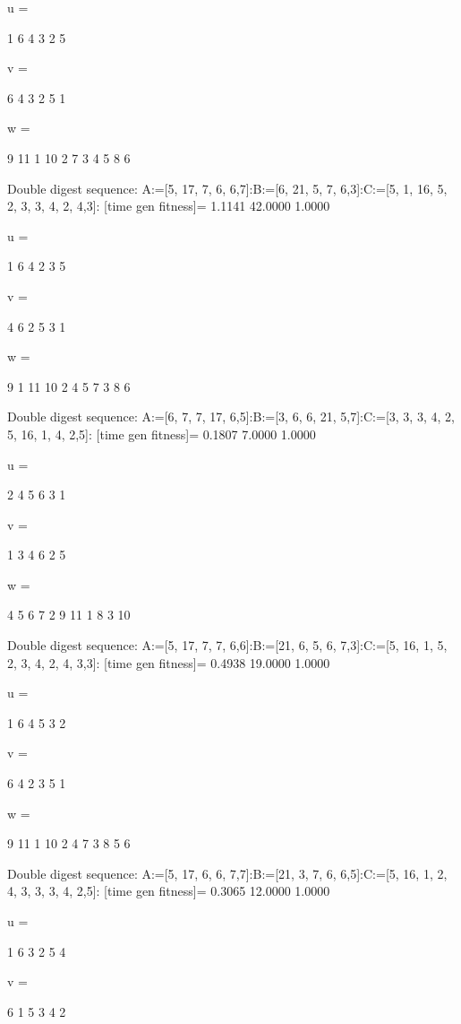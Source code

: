 u =

     1     6     4     3     2     5


v =

     6     4     3     2     5     1


w =

     9    11     1    10     2     7     3     4     5     8     6

Double digest sequence:
A:=[5, 17, 7, 6, 6,7]:B:=[6, 21, 5, 7, 6,3]:C:=[5, 1, 16, 5, 2, 3, 3, 4, 2, 4,3]:
[time gen fitness]=
    1.1141   42.0000    1.0000


u =

     1     6     4     2     3     5


v =

     4     6     2     5     3     1


w =

     9     1    11    10     2     4     5     7     3     8     6

Double digest sequence:
A:=[6, 7, 7, 17, 6,5]:B:=[3, 6, 6, 21, 5,7]:C:=[3, 3, 3, 4, 2, 5, 16, 1, 4, 2,5]:
[time gen fitness]=
    0.1807    7.0000    1.0000


u =

     2     4     5     6     3     1


v =

     1     3     4     6     2     5


w =

     4     5     6     7     2     9    11     1     8     3    10

Double digest sequence:
A:=[5, 17, 7, 7, 6,6]:B:=[21, 6, 5, 6, 7,3]:C:=[5, 16, 1, 5, 2, 3, 4, 2, 4, 3,3]:
[time gen fitness]=
    0.4938   19.0000    1.0000


u =

     1     6     4     5     3     2


v =

     6     4     2     3     5     1


w =

     9    11     1    10     2     4     7     3     8     5     6

Double digest sequence:
A:=[5, 17, 6, 6, 7,7]:B:=[21, 3, 7, 6, 6,5]:C:=[5, 16, 1, 2, 4, 3, 3, 3, 4, 2,5]:
[time gen fitness]=
    0.3065   12.0000    1.0000


u =

     1     6     3     2     5     4


v =

     6     1     5     3     4     2


